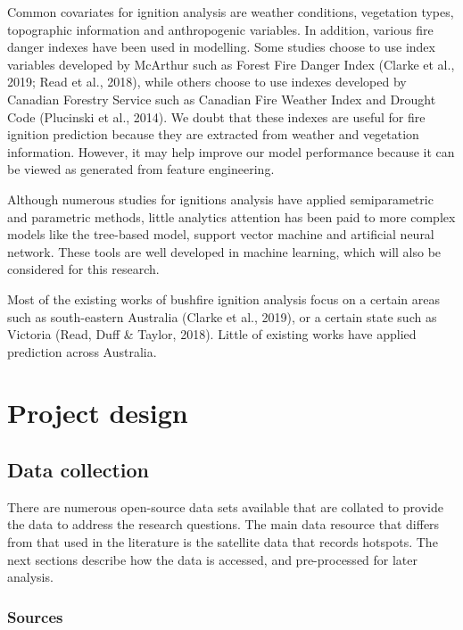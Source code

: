 \documentclass[11pt,a4paper,]{article}
\begin{document}
Common covariates for ignition analysis are weather conditions, vegetation types, topographic information and anthropogenic variables. In addition, various fire danger indexes have been used in modelling. Some studies choose to use index variables developed by McArthur such as Forest Fire Danger Index (Clarke et al., 2019; Read et al., 2018), while others choose to use indexes developed by Canadian Forestry Service such as Canadian Fire Weather Index and Drought Code (Plucinski et al., 2014). We doubt that these indexes are useful for fire ignition prediction because they are extracted from weather and vegetation information. However, it may help improve our model performance because it can be viewed as generated from feature engineering.

Although numerous studies for ignitions analysis have applied semiparametric and parametric methods, little analytics attention has been paid to more complex models like the tree-based model, support vector machine and artificial neural network. These tools are well developed in machine learning, which will also be considered for this research.

Most of the existing works of bushfire ignition analysis focus on a certain areas such as south-eastern Australia (Clarke et al., 2019), or a certain state such as Victoria (Read, Duff \& Taylor, 2018). Little of existing works have applied prediction across Australia.

\hypertarget{project-design}{%
\section{Project design}\label{project-design}}

\hypertarget{data-collection}{%
\subsection{Data collection}\label{data-collection}}

There are numerous open-source data sets available that are collated to provide the data to address the research questions. The main data resource that differs from that used in the literature is the satellite data that records hotspots. The next sections describe how the data is accessed, and pre-processed for later analysis.

\hypertarget{sources}{%
\subsubsection{Sources}\label{sources}}
\end{document}
